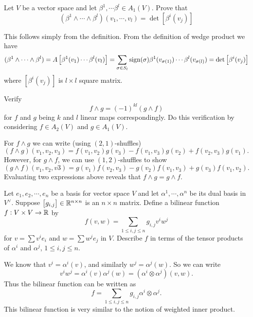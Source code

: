 \begin{problem}
	\label{problem:1-covectorAndDeterminant}
	Let $ V $ be a vector space and let $ \beta^1,\cdots \beta^l \in A_1(V) $. Prove that 
	\[ (\beta^1 \wedge \cdots \wedge \beta^l)(v_1,\cdots,v_l) = \det\left[ \beta^i(v_j) \right]  \]
\end{problem}
\begin{solution}
	This follows simply from the definition. From the definition of wedge product we have
	\[ (\beta^1 \wedge \cdots \wedge \beta^l) = A \left[\beta^1(v_1)\cdots \beta^l(v_l)\right] = \sum_{\sigma \in S_l} \operatorname{sign}(\sigma) \beta^1(v_{\sigma(1)}) \cdots \beta^l(v_{\sigma(l)}) = \det\left[ \beta^i(v_j) \right] \]
	where $ \left[ \beta^i(v_j) \right] $ is $ l\times l $ square matrix.
\end{solution}

\begin{problem}
	Verify 
	\[ f \wedge g = (-1)^{kl}(g\wedge f) \]
	for $ f $ and $ g $ being $ k $ and $ l $ linear maps correspondingly. Do this verification by considering $ f\in A_2(V) $ and $ g \in A_1(V) $.
\end{problem}

\begin{solution}
	For $ f\wedge g $ we can write (using $ (2,1) $-shuffles)
	\[(f\wedge g)(v_1,v_2,v_3) = f(v_1,v_2)g(v_3) - f(v_1,v_3)g(v_2) + f(v_2,v_3)g(v_1).\]
	However, for $ g\wedge f $, we can use $ (1,2) $-shuffles to show
	\[ (g\wedge f)(v_1,v_2,v3) = g(v_1)f(v_2,v_3) - g(v_2)f(v_1,v_3) + g(v_3)f(v_1,v_2).  \]
	Evaluating two expressions above reveals that $ f\wedge g = g \wedge f. $
\end{solution}

\begin{problem}
	Let $ e_1,e_2,\cdots,e_n $ be a basis for vector space $ V $ and let $ \alpha^1,\cdots,\alpha^n $ be its dual basis in $ V^\vee $. Suppose $ \left[g_{i,j}\right] \in \mathbb{R}^{n\times n} $ is an $ n\times n $ matrix. Define a bilinear function $ f: V\times V \to \mathbb{R} $ by
	\[ f(v,w) = \sum_{1 \leq i,j \leq n} g_{i,j}v^i w^j \]
	for $ v = \sum v^i e_i $ and $ w = \sum w^j e_j $ in $ V $. Describe $ f $ in terms of the tensor products of $ \alpha^i $ and $ \alpha^j $, $ 1 \leq i, j \leq n $.
\end{problem}
\begin{solution}
	We know that $ v^i = \alpha^i (v) $, and similarly $ w^j = \alpha^j (w) $. So we can write
	\[ v^i w^j = \alpha^i(v) \alpha^j (w) = (\alpha^i \otimes \alpha^j)(v,w). \]
	Thus the bilinear function can be written as
	\[ f = \sum_{1\leq i,j \leq n} g_{i,j} \alpha^i \otimes \alpha^j. \]
	This bilinear function is very similar to the notion of weighted inner product.
\end{solution}

